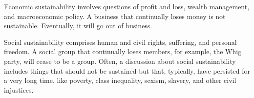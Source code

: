 \documentclass{article}\usepackage[]{graphicx}\usepackage[]{xcolor}
\begin{document}
Economic sustainability
involves questions of profit and loss, wealth management, and
macroeconomic policy.
A business that continually loses money is not sustainable.
Eventually, it will go out of business.

Social sustainability comprises human and 
civil rights,
suffering, and personal freedom.
A social group that continually loses members, for example, the Whig party, will
cease to be a group.
Often, a discussion about social sustainability 
includes things that should not be sustained but that, typically,
have persisted for a very long time, like poverty, class inequality, sexism,
slavery, and other civil injustices.
\end{document}

